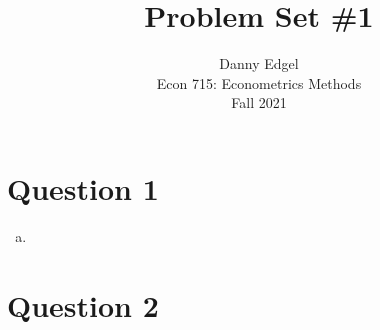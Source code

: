 \documentclass{article}
\begin{document}
\title{	Problem Set \#1 }
\author{ 	Danny Edgel 					\\ 
			Econ 715: Econometrics Methods	\\
			Fall 2021						
		}
\maketitle\thispagestyle{empty}

\section*{Question 1}

\begin{enumerate}[(a)]
    \item 
\end{enumerate}

\section*{Question 2}
\end{document}
